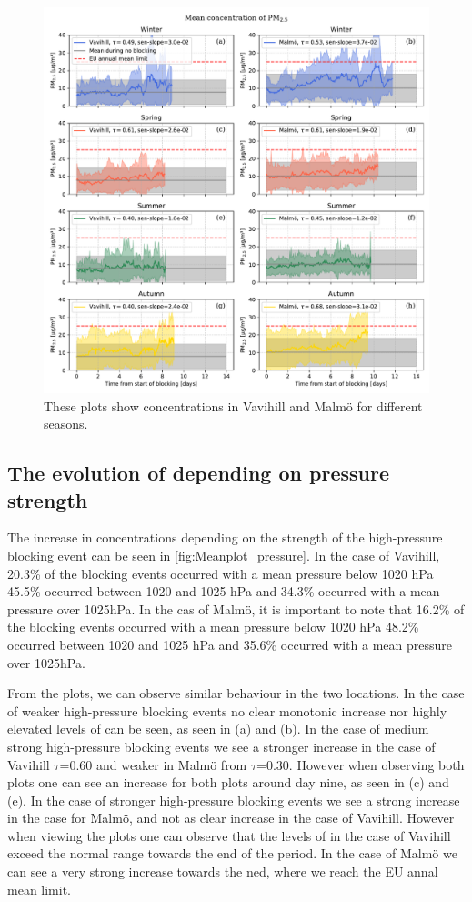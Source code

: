 \begin{figure}[H]
    \centering
    \includegraphics[width=\textwidth]{Figures/Meanplot_seasonal.pdf}
    \caption{These plots show \PM concentrations in Vavihill and Malmö for different seasons. }
    \label{fig:Meanplot_seasonal}
\end{figure}
 

\subsection{The evolution of \texorpdfstring{\PM }{PM2.5} depending on pressure strength}
The increase in \PM  concentrations depending on the strength of the high-pressure blocking event can be seen in \autoref{fig:Meanplot_pressure}. In the case of Vavihill, 20.3\% of the blocking events occurred with a mean pressure below 1020 hPa 45.5\% occurred between 1020 and 1025 hPa and 34.3\% occurred with a mean pressure over 1025hPa. In the cas of Malmö, it is important to note that 16.2\% of the blocking events occurred with a mean pressure below 1020 hPa 48.2\% occurred between 1020 and 1025 hPa and 35.6\% occurred with a mean pressure over 1025hPa.

From the plots, we can observe similar behaviour in the two locations. In the case of weaker high-pressure blocking events no clear monotonic increase nor highly elevated levels of \PM can be seen, as seen in (a) and (b). In the case of medium strong high-pressure blocking events we see a stronger increase in the case of Vavihill $\tau$=0.60 and weaker in Malmö from $\tau$=0.30. However when observing both plots one can see an increase for both plots around day nine, as seen in (c) and (e). In the case of stronger high-pressure blocking events we see a strong increase in the case for Malmö, and not as clear increase in the case of Vavihill. However when viewing the plots one can observe that the levels of \PM in the case of Vavihill exceed the normal range towards the end of the period. In the case of Malmö we can see a very strong increase towards the ned, where we reach the EU annal mean limit. 

